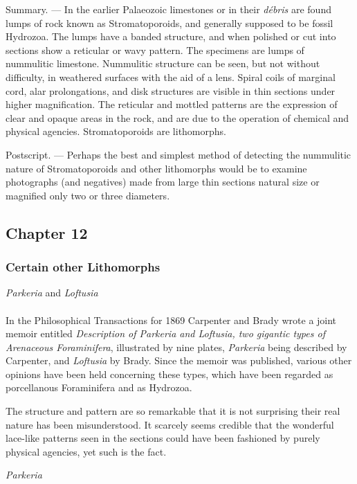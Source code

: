 \documentclass[a4paper, 12pt, oneside]{article}
\begin{document}
Summary. --- In the earlier Palaeozoic limestones or in their \emph{débris} are found lumps of rock known as Stromatoporoids, and generally supposed to be fossil Hydrozoa. The lumps have a banded structure, and when polished or cut into sections show a reticular or wavy pattern. The specimens are lumps of nummulitic limestone. Nummulitic structure can be seen, but not without difficulty, in weathered surfaces with the aid of a lens. Spiral coils of marginal cord, alar prolongations, and disk structures are visible in thin sections under higher magnification. The reticular and mottled patterns are the expression of clear and opaque areas in the rock, and are due to the operation of chemical and physical agencies. Stromatoporoids are lithomorphs.

Postscript. --- Perhaps the best and simplest method of detecting the nummulitic nature of Stromatoporoids and other lithomorphs would be to examine photographs (and negatives) made from large thin sections natural size or magnified only two or three diameters.
\clearpage
\subsection{Chapter 12}
\subsubsection{Certain other Lithomorphs}
\centerline{\emph{Parkeria} and \emph{Loftusia}}
\paragraph{}
In the Philosophical Transactions for 1869 Carpenter and Brady wrote a joint memoir entitled \emph{Description of \emph{Parkeria} and \emph{Loftusia}, two gigantic types of Arenaceous Foraminifera}, illustrated by nine plates, \emph{Parkeria} being described by Carpenter, and \emph{Loftusia} by Brady. Since the memoir was published, various other opinions have been held concerning these types, which have been regarded as porcellanous Foraminifera and as Hydrozoa.

The structure and pattern are so remarkable that it is not surprising their real nature has been misunderstood. It scarcely seems credible that the wonderful lace-like patterns seen in the sections could have been fashioned by purely physical agencies, yet such is the fact.

\bigskip
\centerline{\emph{Parkeria}}
\end{document}
